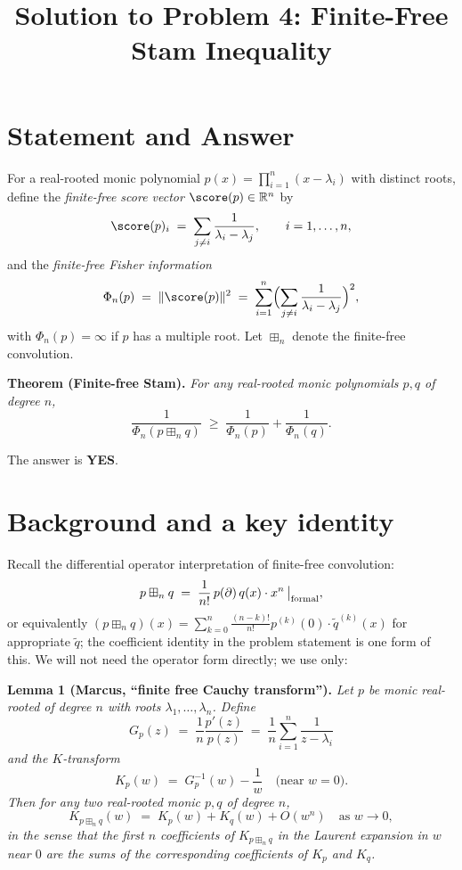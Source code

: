 

\title{Solution to Problem 4: Finite-Free Stam Inequality}
\date{}


\maketitle

\section*{Statement and Answer}

For a real-rooted monic polynomial $p(x)=\prod_{i=1}^n(x-\lambda_i)$ with distinct roots, define the \emph{finite-free score vector} $\score(p)\in\mathbb R^n$ by
\[
\score(p)_i \;=\; \sum_{j\ne i}\frac{1}{\lambda_i-\lambda_j},\qquad i=1,\ldots,n,
\]
and the \emph{finite-free Fisher information}
\[
\Phi_n(p) \;=\; \|\score(p)\|^2 \;=\; \sum_{i=1}^n\Bigl(\sum_{j\ne i}\frac{1}{\lambda_i-\lambda_j}\Bigr)^2,
\]
with $\Phi_n(p)=\infty$ if $p$ has a multiple root.  Let $\boxplus_n$ denote the finite-free convolution.

\medskip
\noindent\textbf{Theorem (Finite-free Stam).}  \emph{For any real-rooted monic polynomials $p,q$ of degree $n$,}
\[
\frac{1}{\Phi_n(p\boxplus_n q)}\;\geq\;\frac{1}{\Phi_n(p)}+\frac{1}{\Phi_n(q)}.
\]

\medskip
\noindent The answer is \textbf{YES}.

\section*{Background and a key identity}

Recall the differential operator interpretation of finite-free convolution:
\[
p\boxplus_n q \;=\; \frac{1}{n!}\,p(\partial)\,q(x)\cdot x^n\,\big|_{\rm formal},
\]
or equivalently $(p\boxplus_n q)(x)=\sum_{k=0}^n\frac{(n-k)!}{n!}p^{(k)}(0)\cdot \tilde q^{(k)}(x)$ for appropriate $\tilde q$; the coefficient identity in the problem statement is one form of this.  We will not need the operator form directly; we use only:

\medskip
\noindent\textbf{Lemma 1 (Marcus, ``finite free Cauchy transform'').}  \emph{Let $p$ be monic real-rooted of degree $n$ with roots $\lambda_1,\ldots,\lambda_n$.  Define
\[
G_p(z) \;=\; \frac{1}{n}\frac{p'(z)}{p(z)} \;=\; \frac{1}{n}\sum_{i=1}^n\frac{1}{z-\lambda_i}
\]
and the $K$-transform
\[
K_p(w) \;=\; G_p^{-1}(w) - \frac{1}{w}\quad\text{(near }w=0\text{)}.
\]
Then for any two real-rooted monic $p,q$ of degree $n$,
\[
K_{p\boxplus_n q}(w)\;=\;K_p(w)+K_q(w)+O(w^{n})\quad\text{as }w\to 0,
\]
in the sense that the first $n$ coefficients of $K_{p\boxplus_n q}$ in the Laurent expansion in $w$ near $0$ are the sums of the corresponding coefficients of $K_p$ and $K_q$.}

